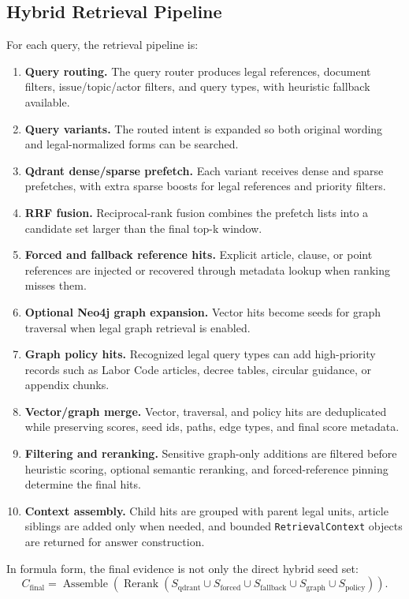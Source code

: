 \subsection{Hybrid Retrieval Pipeline}
For each query, the retrieval pipeline is:

\begin{enumerate}
  \item \textbf{Query routing.} The query router produces legal references, document filters, issue/topic/actor filters, and query types, with heuristic fallback available.
  \item \textbf{Query variants.} The routed intent is expanded so both original wording and legal-normalized forms can be searched.
  \item \textbf{Qdrant dense/sparse prefetch.} Each variant receives dense and sparse prefetches, with extra sparse boosts for legal references and priority filters.
  \item \textbf{RRF fusion.} Reciprocal-rank fusion combines the prefetch lists into a candidate set larger than the final top-k window.
  \item \textbf{Forced and fallback reference hits.} Explicit article, clause, or point references are injected or recovered through metadata lookup when ranking misses them.
  \item \textbf{Optional Neo4j graph expansion.} Vector hits become seeds for graph traversal when legal graph retrieval is enabled.
  \item \textbf{Graph policy hits.} Recognized legal query types can add high-priority records such as Labor Code articles, decree tables, circular guidance, or appendix chunks.
  \item \textbf{Vector/graph merge.} Vector, traversal, and policy hits are deduplicated while preserving scores, seed ids, paths, edge types, and final score metadata.
  \item \textbf{Filtering and reranking.} Sensitive graph-only additions are filtered before heuristic scoring, optional semantic reranking, and forced-reference pinning determine the final hits.
  \item \textbf{Context assembly.} Child hits are grouped with parent legal units, article siblings are added only when needed, and bounded \texttt{RetrievalContext} objects are returned for answer construction.
\end{enumerate}

In formula form, the final evidence is not only the direct hybrid seed set:
\[
C_{\mathrm{final}} =
\operatorname{Assemble}
\left(
\operatorname{Rerank}
\left(
S_{\mathrm{qdrant}}
\cup S_{\mathrm{forced}}
\cup S_{\mathrm{fallback}}
\cup S_{\mathrm{graph}}
\cup S_{\mathrm{policy}}
\right)
\right).
\]

